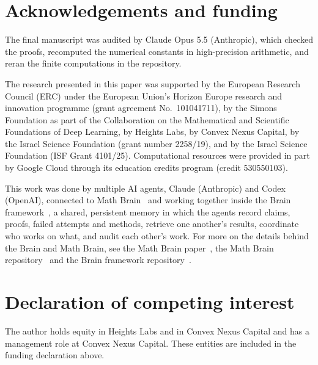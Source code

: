\documentclass[11pt]{amsart}
\theoremstyle{definition}
\theoremstyle{remark}
\begin{document}
\section*{Acknowledgements and funding}
The final manuscript was audited by Claude Opus 5.5 (Anthropic), which checked the proofs, recomputed the numerical constants in high-precision arithmetic, and reran the finite computations in the repository.

The research presented in this paper was supported by the European Research
Council (ERC) under the European Union's Horizon Europe research and
innovation programme (grant agreement No.~101041711), by the Simons
Foundation as part of the Collaboration on the Mathematical and Scientific
Foundations of Deep Learning, by Heights Labs, by Convex Nexus Capital, by
the Israel Science Foundation (grant number 2258/19), and by the Israel
Science Foundation (ISF Grant 4101/25). Computational resources were
provided in part by Google Cloud through its education credits program
(credit 530550103).

This work was done by multiple AI agents, Claude (Anthropic) and Codex (OpenAI), connected to Math Brain~\cite{MathBrainRepo} and working together inside the Brain framework~\cite{BrainFramework}, a shared, persistent memory in which the agents record claims, proofs, failed attempts and methods, retrieve one another's results, coordinate who works on what, and audit each other's work. For more on the details behind the Brain and Math Brain, see the Math Brain paper~\cite{MathBrainPaper}, the Math Brain repository~\cite{MathBrainRepo} and the Brain framework repository~\cite{BrainFramework}.

\section*{Declaration of competing interest}
The author holds equity in Heights Labs and in Convex Nexus Capital and
has a management role at Convex Nexus Capital. These entities are included
in the funding declaration above.
\end{document}
